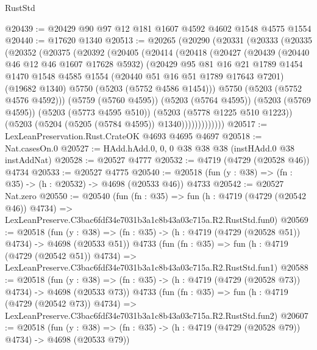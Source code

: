 \begin{lexlean}{RustStd}
\begin{coremodule}
@20439 := @20429 @90 @97 @12 @181 @1607 @4592 @4602 @1548 @4575 @1554
@20440 := @17620 @1340
@20513 := @20265
    (@20290
      (@20331
        (@20333
          (@20335
            (@20352
              (@20375
                (@20392
                  (@20405
                    (@20414
                      (@20418
                        (@20427
                          (@20439
                            (@20440 @46 @12 @46 @1607 @17628 @5932)
                            (@20429
                              @95
                              @81
                              @16
                              @21
                              @1789
                              @1454
                              @1470
                              @1548
                              @4585
                              @1554
                              (@20440 @51 @16 @51 @1789 @17643 @7201)
                              (@19682 @1340)
                              @5750
                              (@5203 (@5752 @4586 @1454)))
                            @5750
                            (@5203 (@5752 @4576 @4592)))
                          (@5759 (@5760 @4595))
                          (@5203 (@5764 @4595))
                          (@5203 (@5769 @4595))
                          (@5203 (@5773 @4595 @510))
                          (@5203 (@5778 @1225 @510 @1223))
                          (@5203 (@5204 (@5205 (@5784 @4595)) @1340)))))))))))))
@20517 := LexLeanPreservation.Rust.CrateOK @4693 @4695 @4697
@20518 := Nat.casesOn.{0}
@20527 := HAdd.hAdd.{0, 0, 0} @38 @38 @38 (instHAdd.{0} @38 instAddNat)
@20528 := @20527 @4777
@20532 := @4719 (@4729 (@20528 @46)) @4734
@20533 := @20527 @4775
@20540 := @20518 (fun (y : @38) => (fn : @35) -> (h : @20532) -> @4698 (@20533 @46)) @4733
@20542 := @20527 Nat.zero
@20550 := @20540
    (fun (fn : @35) =>
    fun (h : @4719 (@4729 (@20542 @46)) @4734) =>
    LexLeanPreserve.C3bac6fdf34e7031b3a1c8b43a03c715a.R2.RustStd.fun0)
@20569 := @20518
    (fun (y : @38) => (fn : @35) -> (h : @4719 (@4729 (@20528 @51)) @4734) -> @4698 (@20533 @51))
    @4733
    (fun (fn : @35) =>
    fun (h : @4719 (@4729 (@20542 @51)) @4734) =>
    LexLeanPreserve.C3bac6fdf34e7031b3a1c8b43a03c715a.R2.RustStd.fun1)
@20588 := @20518
    (fun (y : @38) => (fn : @35) -> (h : @4719 (@4729 (@20528 @73)) @4734) -> @4698 (@20533 @73))
    @4733
    (fun (fn : @35) =>
    fun (h : @4719 (@4729 (@20542 @73)) @4734) =>
    LexLeanPreserve.C3bac6fdf34e7031b3a1c8b43a03c715a.R2.RustStd.fun2)
@20607 := @20518
    (fun (y : @38) => (fn : @35) -> (h : @4719 (@4729 (@20528 @79)) @4734) -> @4698 (@20533 @79))

\end{coremodule}
\end{lexlean}
